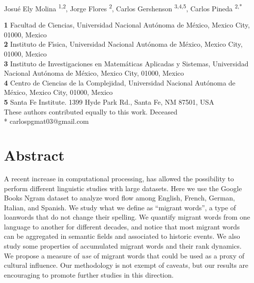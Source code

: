 \documentclass[10pt,letterpaper]{article} %
\begin{document}
\vspace*{0.2in}

\begin{flushleft}
{\Large
\textbf{} %
}
\newline
Josué Ely Molina  \ddag\textsuperscript{1,2}, %
Jorge Flores      \dag \textsuperscript{2}, %
Carlos Gershenson \textsuperscript{3,4,5},
Carlos Pineda     \ddag\textsuperscript{2,*}    %
% 


\bigskip
\newcommand{\unam}{Universidad Nacional Aut\'{o}noma de M\'{e}xico, Mexico City, 01000, Mexico}
\textbf{1} Facultad de Ciencias, \unam \\
\textbf{2} Instituto de F\'{\i}sica, \unam \\
\textbf{3} Instituto de Investigaciones en Matem\'{a}ticas Aplicadas y Sistemas, \unam \\
\textbf{4} Centro de Ciencias de la Complejidad, \unam \\
\textbf{5} Santa Fe Institute. 1399 Hyde Park Rd., Santa Fe, NM 87501, USA\\
\bigskip
\ddag These authors contributed equally to this work.
\dag Deceased \\
* carlospgmat03@gmail.com
\end{flushleft}
\section*{Abstract} %

A recent increase in computational processing, has allowed the possibility to perform different linguistic studies with large datasets. Here we use the Google Books Ngram dataset to analyze word flow among English, French, German, Italian, and Spanish. We study what we define as ``migrant words'', a type of loanwords that do not change their spelling. We quantify migrant words from one language to another for different decades, and notice that most migrant words can be aggregated in semantic fields and associated to historic events. We also study some properties of accumulated migrant words and their rank dynamics. We propose a measure of \emph{use} of migrant words that could be used as a proxy of cultural influence. Our methodology is not exempt of caveats, but our results are encouraging to promote further studies in this direction.
\end{document}
